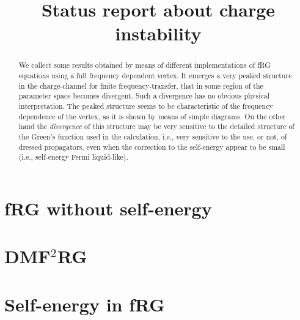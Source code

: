 \documentclass[a4paper,11pt]{article}
\begin{document}
\title{Status report about charge instability}

\maketitle 







\begin{abstract}

We collect some results obtained by means of different implementations of fRG equations using a full frequency dependent vertex. 
It emerges a very peaked structure in the charge-channel for finite frequency-transfer, that in some region of the parameter space becomes divergent. Such a divergence has no obvious physical interpretation.  
The peaked structure seems to be characteristic of the frequency dependence of the vertex, as it is shown by means of simple diagrams. 
On the other hand the \emph{divergence} of this structure may be very sensitive to the detailed structure of the Green's function used in the calculation, i.e., very sensitive to the use, or not, of dressed propagators, even when the correction to the self-energy appear to be small (i.e., self-energy Fermi liquid-like).  

\end{abstract}

\maketitle

\section{fRG without self-energy} 				
\label{sec:frgnoself}
  

\section{DMF$^2$RG }	
\label{sec:dmf2rgnoself}

\section{Self-energy in fRG}				
\label{sec:frgself}

\end{document}
